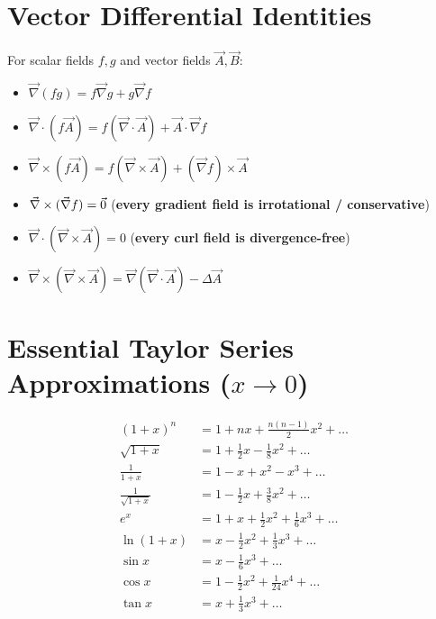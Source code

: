 \section{Vector Differential Identities}

For scalar fields $f, g$ and vector fields $\vec{A}, \vec{B}$:
\begin{itemize}[leftmargin=1.4em,itemsep=2pt]
  \item $\vec{\nabla}(fg) = f\vec{\nabla} g + g\vec{\nabla} f$
  \item $\vec{\nabla}\cdot(f\vec{A}) = f(\vec{\nabla}\cdot\vec{A}) + \vec{A}\cdot\vec{\nabla} f$
  \item $\vec{\nabla}\times(f\vec{A}) = f(\vec{\nabla}\times\vec{A}) + (\vec{\nabla} f)\times\vec{A}$
  \item $\vec{\nabla}\times(\vec{\nabla} f) = \vec{0}$ \quad (\textbf{every gradient field is irrotational / conservative})
  \item $\vec{\nabla}\cdot(\vec{\nabla}\times\vec{A}) = 0$ \quad (\textbf{every curl field is divergence-free})
  \item $\vec{\nabla}\times(\vec{\nabla}\times\vec{A}) = \vec{\nabla}(\vec{\nabla}\cdot\vec{A}) - \Delta\vec{A}$
\end{itemize}

\section{Essential Taylor Series Approximations ($x \to 0$)}

\begin{align*}
(1 + x)^n &= 1 + nx + \frac{n(n-1)}{2}x^2 + \dots \\
\sqrt{1 + x} &= 1 + \frac{1}{2}x - \frac{1}{8}x^2 + \dots \\
\frac{1}{1 + x} &= 1 - x + x^2 - x^3 + \dots \\
\frac{1}{\sqrt{1 + x}} &= 1 - \frac{1}{2}x + \frac{3}{8}x^2 + \dots \\
e^x &= 1 + x + \frac{1}{2}x^2 + \frac{1}{6}x^3 + \dots \\
\ln(1 + x) &= x - \frac{1}{2}x^2 + \frac{1}{3}x^3 + \dots \\
\sin x &= x - \frac{1}{6}x^3 + \dots \\
\cos x &= 1 - \frac{1}{2}x^2 + \frac{1}{24}x^4 + \dots \\
\tan x &= x + \frac{1}{3}x^3 + \dots
\end{align*}
